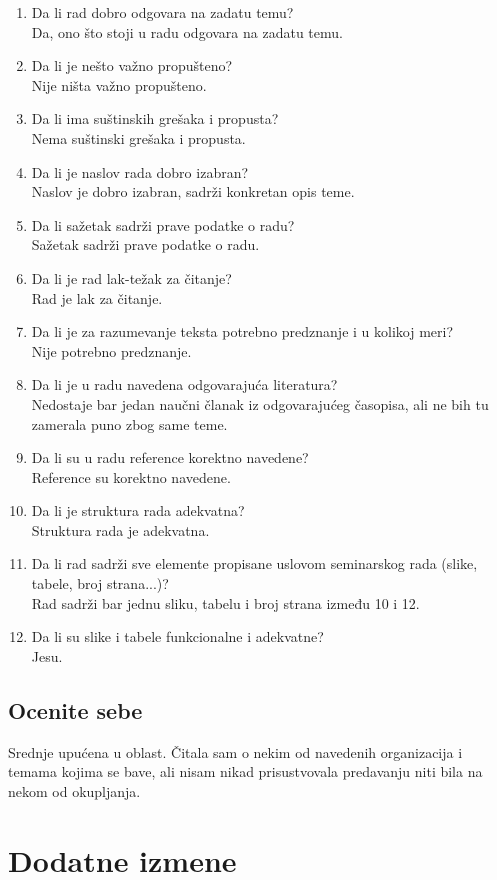 \documentclass[a4paper]{report}
\begin{document}
\begin{enumerate}
\item Da li rad dobro odgovara na zadatu temu?\\
Da, ono što stoji u radu odgovara na zadatu temu.
\item Da li je nešto važno propušteno?\\
Nije ništa važno propušteno.
\item Da li ima suštinskih grešaka i propusta?\\
Nema suštinski grešaka i propusta.
\item Da li je naslov rada dobro izabran?\\
Naslov je dobro izabran, sadrži konkretan opis teme.
\item Da li sažetak sadrži prave podatke o radu?\\
Sažetak sadrži prave podatke o radu.
\item Da li je rad lak-težak za čitanje?\\
Rad je lak za čitanje.
\item Da li je za razumevanje teksta potrebno predznanje i u kolikoj meri?\\
Nije potrebno predznanje.
\item Da li je u radu navedena odgovarajuća literatura?\\
Nedostaje bar jedan naučni članak iz odgovarajućeg časopisa, ali ne bih tu zamerala puno zbog same teme.
\item Da li su u radu reference korektno navedene?\\
Reference su korektno navedene.
\item Da li je struktura rada adekvatna?\\
Struktura rada je adekvatna.
\item Da li rad sadrži sve elemente propisane uslovom seminarskog rada (slike, tabele, broj strana...)?\\
Rad sadrži bar jednu sliku, tabelu i broj strana između 10 i 12.
\item Da li su slike i tabele funkcionalne i adekvatne?\\
Jesu.
\end{enumerate}

\section{Ocenite sebe}
Srednje upućena u oblast. Čitala sam o nekim od navedenih organizacija i temama kojima se bave, ali nisam nikad prisustvovala predavanju niti  bila na nekom od okupljanja.


\chapter{Dodatne izmene}
\end{document}
